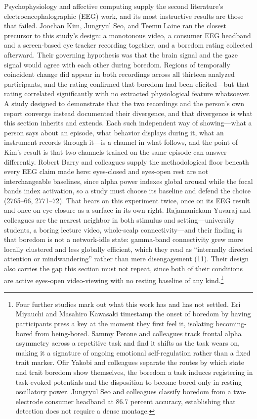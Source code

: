 Psychophysiology and affective computing supply the second literature's electroencephalographic
(EEG) work, and its most instructive results are those that failed. Joochan Kim, Jungryul Seo,
and Teemu Laine ran the closest precursor to this study's design: a monotonous video, a
consumer EEG headband and a screen-based eye tracker recording together, and a boredom rating
collected afterward. Their governing hypothesis was that the brain signal and the gaze signal
would agree with each other during boredom. Regions of temporally coincident change did appear
in both recordings across all thirteen analyzed participants, and the rating confirmed that
boredom had been elicited---but that rating correlated significantly with no extracted
physiological feature whatsoever. A study designed to demonstrate that the two recordings and the
person's own report converge instead documented their divergence, and that divergence is what
this section inherits and extends. Each such independent way of showing---what a person says
about an episode, what behavior displays during it, what an instrument records through it---is
a channel in what follows, and the point of Kim's result is that two channels trained on the
same episode can answer differently. Robert Barry and colleagues supply the methodological
floor beneath every EEG claim made here: eyes-closed and eyes-open rest are not interchangeable
baselines, since alpha power indexes global arousal while the focal bands index activation, so
a study must choose its baseline and defend the choice (2765--66, 2771--72). That bears on
this experiment twice, once on its EEG result and once on eye closure as a surface in its own
right. Rajamanickam Yuvaraj and colleagues are the nearest neighbor in both stimulus and
setting---university students, a boring lecture video, whole-scalp connectivity---and their
finding is that boredom is not a network-idle state: gamma-band connectivity grew more locally
clustered and less globally efficient, which they read as ``internally directed attention or mindwandering'' rather than mere
disengagement (11). Their design also carries the gap this section must not repeat, since both
of their conditions are active eyes-open video-viewing with no resting baseline of any
kind.\footnote{Four further studies mark out what this work has and has not settled. Eri
Miyauchi and Masahiro Kawasaki timestamp the onset of boredom by having participants press a
key at the moment they first feel it, isolating becoming-bored from being-bored. Sammy Perone
and colleagues track frontal alpha asymmetry across a repetitive task and find it shifts as
the task wears on, making it a signature of ongoing emotional self-regulation rather than a
fixed trait marker. Ofir Yakobi and colleagues separate the routes by which state and trait
boredom show themselves, the boredom a task induces registering in task-evoked potentials and
the disposition to become bored only in resting oscillatory power. Jungryul Seo and colleagues classify boredom from a
two-electrode consumer headband at 86.7 percent accuracy, establishing that detection does not
require a dense montage.}

